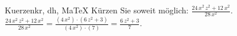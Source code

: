 \begin{MAufgabe}{Kuerzen}{kr, dh, MaTeX}
K\"urzen Sie soweit m\"oglich: $\frac{24\, x^2\, z^2 + 12\, x^2}{28\, x^2}$.\\ 
\ifLsg\MLoesung
\quad $\frac{24\, x^2\, z^2 + 12\, x^2}{28\, x^2}=\frac{(4\, x^2)\cdot(6\, z^2 + 3)}{(4\, x^2)\cdot(7)}=\frac{6\, z^2 + 3}{7}$.\else\relax\fi
 \end{MAufgabe}